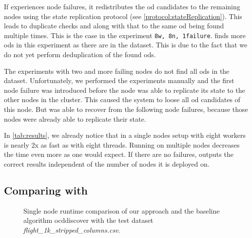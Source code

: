   If \dodo{} experiences node failures, it redistributes the \gls{od} candidates to the remaining nodes using the state replication protocol (see \cref{protocol:stateReplication}).
  This leads to duplicate checks and along with that to the same \gls{od} being found multiple times.
  This is the case in the experiment \texttt{8w, 8n, 1failure}.
  \dodo{} finds more \glspl{od} in this experiment as there are in the dataset.
  This is due to the fact that we do not yet perform deduplication of the found \glspl{od}.

  The experiments with two and more failing nodes do not find all \glspl{od} in the dataset.
  Unfortunately, we performed the experiments manually and the first node failure was introduced before the node was able to replicate its state to the other nodes in the cluster.
  This caused the system to loose all \gls{od} candidates of this node.
  But \dodo{} was able to recover from the following node failures, because those nodes were already able to replicate their state.

  In \cref{tab:results}, we already notice that \dodo{} in a single nodes setup with eight workers is nearly 2x as fast as \ocddiscover{} with eight threads.
  Running \dodo{} on multiple nodes decreases the time even more as one would expect.
  If there are no failures, \dodo{} outputs the correct results independent of the number of nodes it is deployed on.
  
\subsection{Comparing with \ocddiscover{}}\label{sec:evaluation:comparison}

  \begin{figure}[htbp]
    \centering
%    
    \caption{Single node runtime comparison of our approach and the baseline algorithm \gls{ocddiscover} with the test dataset \textit{flight\_1k\_stripped\_columns.csv}.}
    \label{fig:runtime-vs-ocddiscover}
  \end{figure}

